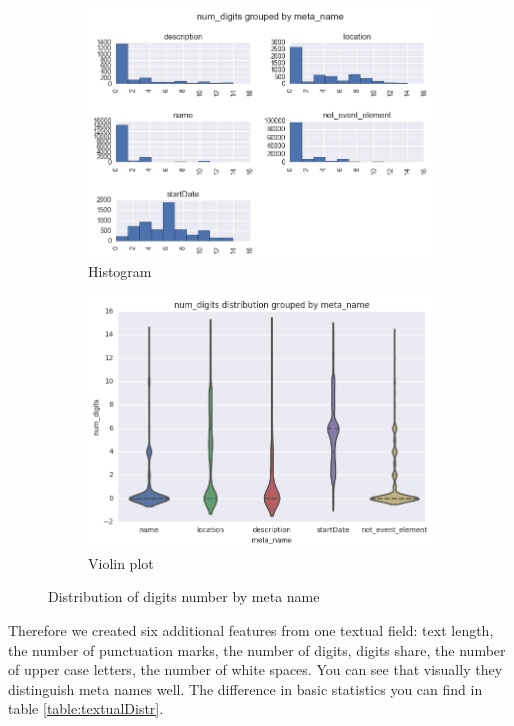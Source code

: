 \begin{figure}[h]
\begin{subfigure}{.5\textwidth}
  \centering
  \includegraphics[width=1\textwidth]{figures07/distrDigitsByMeta}
  \caption{Histogram}
\end{subfigure}
\begin{subfigure}{.5\textwidth}
  \centering
  \includegraphics[width=1\textwidth]{figures07/distrDigitsByMeta_violin}
  \caption{Violin plot}
\end{subfigure}
\caption{Distribution of digits number by meta name}
\label{fig:distrDigitsByMeta}
\end{figure}

Therefore we created six additional features from one textual field: text length, the number of punctuation marks, the number of digits, digits share, the number of upper case letters, the number of white spaces. You can see that visually they distinguish meta names well. The difference in basic statistics you can find in table \ref{table:textualDistr}. \\

